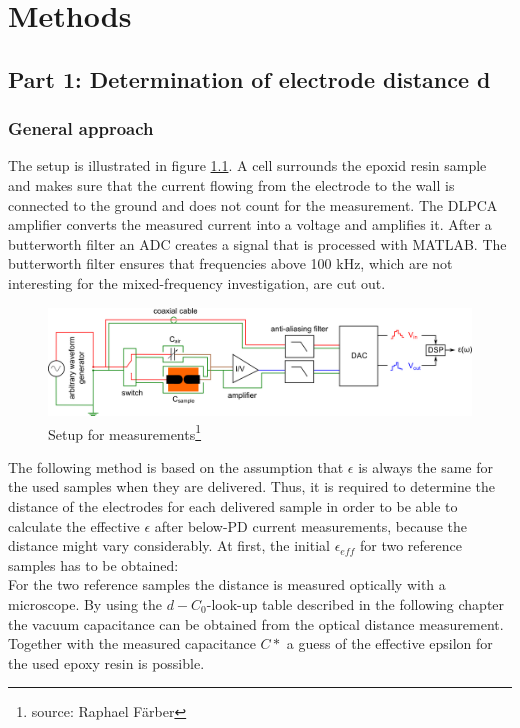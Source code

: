 \chapter{Methods}
\section{Part 1: Determination of electrode distance d}
\subsection{General approach}
The setup is illustrated in figure \ref{sec.setup_amp_1}. A cell surrounds the  epoxid resin sample and makes sure that the current flowing from the electrode to the wall is connected to the ground and does not count for the measurement. The DLPCA amplifier converts the measured current into a voltage and amplifies it. After a butterworth filter an ADC creates a signal that is processed with MATLAB. The butterworth filter ensures that frequencies above 100 kHz, which are not interesting for the mixed-frequency investigation, are cut out. 

\begin{figure}[htbp]
	\centering
	\includegraphics[width=\textwidth]{figures/Method/setup/setup_amplifier.png}		
	\caption[Kurze Abbildungsbeschreibung]{Setup for measurements\footnote{source: Raphael F\"arber}} 
	\label{sec.setup_amp_1}

\end{figure}
\label{sec:general_approach}
The following method is based on the assumption that  $\epsilon$ is always the same for the used samples when they are delivered. Thus, it is required to determine the distance of the electrodes for each delivered sample in order to be able to calculate the effective $\epsilon$ after below-PD current measurements, because the distance might vary considerably. 
At first, the initial $\epsilon_{eff}$ for two reference samples has to be obtained:\\
For the two reference samples the distance is measured optically with a microscope. By using the $d-C_0$-look-up table described in the following chapter the vacuum capacitance can be obtained from the optical distance measurement. Together with the measured capacitance $C*$ a guess of the effective epsilon for the used epoxy resin is possible. 

